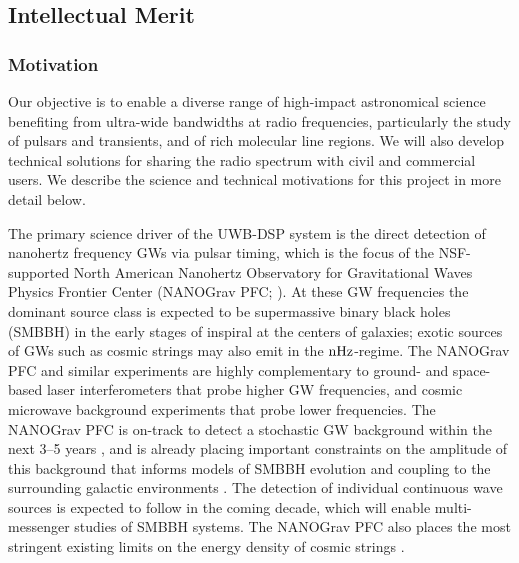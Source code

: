 \documentclass[10pt]{myNSF}
\begin{document}
\subsection{Intellectual Merit}
\label{sec:IM}

\subsubsection{Motivation}
\label{sec:motivation}

Our objective is to enable a diverse range of high-impact astronomical
science benefiting from ultra-wide bandwidths at radio frequencies,
particularly the study of pulsars and transients, and of rich
molecular line regions.  We will also develop technical solutions for
sharing the radio spectrum with civil and commercial users.  We
describe the science and technical motivations for this project in
more detail below.

\label{sec:science_motivation}

 The primary science driver
of the UWB-DSP system is the direct detection of nanohertz frequency
GWs via pulsar timing, which is the focus of the NSF-supported North
American Nanohertz Observatory for Gravitational Waves Physics
Frontier Center (NANOGrav PFC; \cite{mcl13}).  At these GW
frequencies the dominant source class is expected to be supermassive
binary black holes (SMBBH) in the early stages of inspiral at the
centers of galaxies; exotic sources of GWs such as cosmic strings may
also emit in the $\textrm{nHz}$-regime.  The NANOGrav PFC and similar
experiments are highly complementary to ground- and space-based laser
interferometers that probe higher GW frequencies, and cosmic microwave
background experiments that probe lower frequencies.  The NANOGrav PFC
is on-track to detect a stochastic GW background within the next 3--5
years \citep{tve+15}, and is already placing important constraints on
the amplitude of this background that informs models of SMBBH
evolution and coupling to the surrounding galactic environments
\citep{abb+16,abb+18}.  The detection of individual continuous wave
sources is expected to follow in the coming decade, which will enable
multi-messenger studies of SMBBH systems.  The NANOGrav PFC also
places the most stringent existing limits on the energy density of
cosmic strings \citep{abb+18}.
\end{document}
